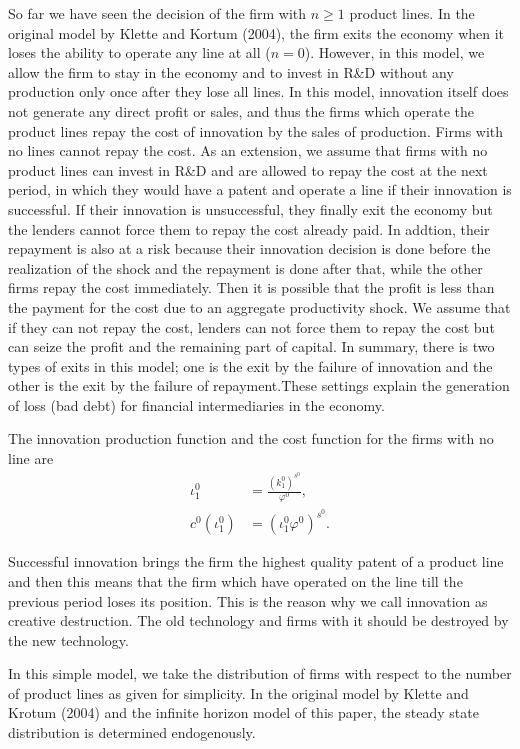 \documentclass[a4paper,12pt]{article}
\begin{document}
So far we have seen the decision of the firm with $n\geq 1$ product lines. In the original model by Klette and Kortum (2004), the firm exits the economy when it loses the ability to operate any line at all ($n=0$). However, in this model, we allow the firm to stay in the economy and to invest in R\&D without any production only once after they lose all lines. In this model, innovation itself does not generate any direct profit or sales, and thus the firms which operate the product lines repay the cost of innovation by the sales of production. Firms with no lines cannot repay the cost. As an extension, we assume that firms with no product lines can invest in R\&D and are allowed to repay the cost at the next period, in which they would have a patent and operate a line if their innovation is successful. If their innovation is unsuccessful, they finally exit the economy but the lenders cannot force them to repay the cost already paid. In addtion, their repayment is also at a risk because their innovation decision is done before the realization of the shock and the repayment is done after that, while the other firms repay the cost immediately. Then it is possible that the profit is less than the payment for the cost due to an aggregate productivity shock.  We assume that if they can not repay the cost, lenders can not force them to repay the cost but can seize the profit and the remaining part of capital. In summary, there is two types of exits in this model; one is the exit by the failure of innovation and the other is the exit by the failure of repayment.These settings explain the generation of loss (bad debt) for financial intermediaries in the economy. \par
The innovation production function and the cost function for the firms with no line are
\begin{align}
    \iota_1^0  &= \frac{(k_1^0)^{s^0}}{\varphi^0},\\
    c^0(\iota_1^0) &= (\iota_1^0\varphi^0)^{s^0}.
\end{align}
\par
Successful innovation brings the firm the highest quality patent of a product line and then this means that the firm which have operated on the line till the previous period loses its position. This is the reason why we call innovation as creative destruction. The old technology and firms with it should be destroyed by the new technology. \par
In this simple model, we take the distribution of firms with respect to the number of product lines as given for simplicity. In the original model by Klette and Krotum (2004) and the infinite horizon model of this paper, the steady state distribution is determined endogenously.
\end{document}
